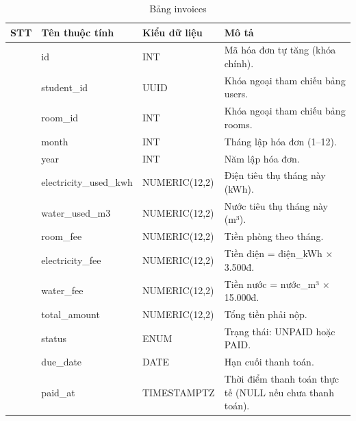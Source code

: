 \documentclass[13pt,a4paper]{extarticle}
\numberwithin{figure}{section}
\numberwithin{table}{section}
\begin{document}
	\begin{table}[H]
		\centering
		\caption{Bảng invoices}
		\label{tab:invoices}
		\begingroup
		\setlength{\tabcolsep}{3pt}
		\begin{tabularx}{\textwidth}{|>{\centering\arraybackslash}p{1cm}|>{\raggedright\arraybackslash}p{3.8cm}|>{\raggedright\arraybackslash}p{3.2cm}|Y|}
			\hline
			\centering\textbf{STT} & \centering\textbf{Tên thuộc tính} & \centering\textbf{Kiểu dữ liệu} & \centering\arraybackslash\textbf{Mô tả} \\
			 & id & INT & Mã hóa đơn tự tăng (khóa chính). \\
			 & student\_id & UUID & Khóa ngoại tham chiếu bảng users. \\
			 & room\_id & INT & Khóa ngoại tham chiếu bảng rooms. \\
			 & month & INT & Tháng lập hóa đơn (1--12). \\
			 & year & INT & Năm lập hóa đơn. \\
			 & electricity\_used\_kwh & NUMERIC(12,2) & Điện tiêu thụ tháng này (kWh). \\
			 & water\_used\_m3 & NUMERIC(12,2) & Nước tiêu thụ tháng này (m³). \\
			 & room\_fee & NUMERIC(12,2) & Tiền phòng theo tháng. \\
			 & electricity\_fee & NUMERIC(12,2) & Tiền điện = điện\_kWh $\times$ 3.500đ. \\
			 & water\_fee & NUMERIC(12,2) & Tiền nước = nước\_m³ $\times$ 15.000đ. \\
			 & total\_amount & NUMERIC(12,2) & Tổng tiền phải nộp. \\
			 & status & ENUM & Trạng thái: UNPAID hoặc PAID. \\
			 & due\_date & DATE & Hạn cuối thanh toán. \\
			 & paid\_at & TIMESTAMPTZ & Thời điểm thanh toán thực tế (NULL nếu chưa thanh toán). \\
			\hline
		\end{tabularx}
		\endgroup
	\end{table}
	
\end{document}
